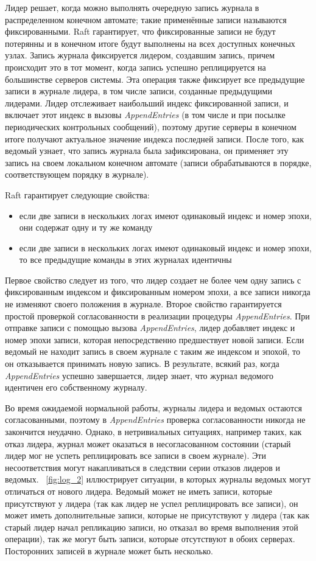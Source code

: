 \documentclass[subf, href, colorlinks=true, 14pt,
times, mtpro, specialist]{disser}
\newcommand{\figref}[1]{\figurename~\ref{#1}}
\theoremstyle{definition}
\begin{document}
Лидер решает, когда можно выполнять очередную запись журнала в распределенном конечном автомате; такие применённые записи называются фиксированными. Raft гарантирует, что фиксированные записи не будут потерянны и в конечном итоге будут выполнены на всех доступных конечных узлах. Запись журнала фиксируется лидером, создавшим запись, причем происходит это в тот момент, когда запись успешно реплицируется на большинстве серверов системы. Эта операция также фиксирует все предыдущие записи в журнале лидера, в том числе записи, созданные предыдущими лидерами. Лидер отслеживает наибольший индекс фиксированной записи, и включает этот индекс в вызовы \textit{AppendEntries} (в том числе и при посылке периодических контрольных сообщений), поэтому другие серверы в конечном итоге получают актуальное значение индекса последней записи. После того, как ведомый узнает, что запись журнала была зафиксирована, он применяет эту запись на своем локальном конечном автомате (записи обрабатываются в порядке, соответствующем порядку в журнале).

Raft гарантирует следующие свойства:
\begin{itemize}
\item если две записи в нескольких логах имеют одинаковый индекс и номер эпохи, они содержат одну и ту же команду
\item если две записи в нескольких логах имеют одинаковый индекс и номер эпохи, то все предыдущие команды в этих журналах идентичны
\end{itemize}

Первое свойство следует из того, что лидер создает не более чем одну запись с фиксированным индексом и фиксированным номером эпохи, а все записи никогда не изменяют своего положения в журнале. Второе свойство гарантируется простой проверкой согласованности в реализации процедуры \textit{AppendEntries}. При отправке записи с помощью вызова \textit{AppendEntries}, лидер добавляет индекс и номер эпохи записи, которая непосредственно предшествует новой записи. Если ведомый не находит запись в своем журнале с таким же индексом и эпохой, то он отказывается принимать новую запись. В результате, всякий раз, когда \textit{AppendEntries} успешно завершается, лидер знает, что журнал ведомого идентичен его собственному журналу.

Во время ожидаемой нормальной работы, журналы лидера и ведомых остаются согласованными, поэтому в \textit{AppendEntries} проверка согласованности никогда не закончится неудачно. Однако, в нетривиальных ситуациях, например таких, как отказ лидера, журнал может оказаться в несогласованном состоянии (старый лидер мог не успеть реплицировать все записи в своем журнале). Эти несоответствия могут накапливаться в следствии серии отказов лидеров и ведомых. \figref{fig:log_2} иллюстрирует ситуации, в которых журналы ведомых могут отличаться от нового лидера. Ведомый может не иметь записи, которые присутствуют у лидера (так как лидер не успел реплицировать все записи), он может иметь дополнительные записи, которые не присутствуют у лидера (так как старый лидер начал репликацию записи, но отказал во время выполнения этой операции), так же могут быть записи, которые отсутствуют в обоих серверах. Посторонних записей в журнале может быть несколько.
\end{document}
